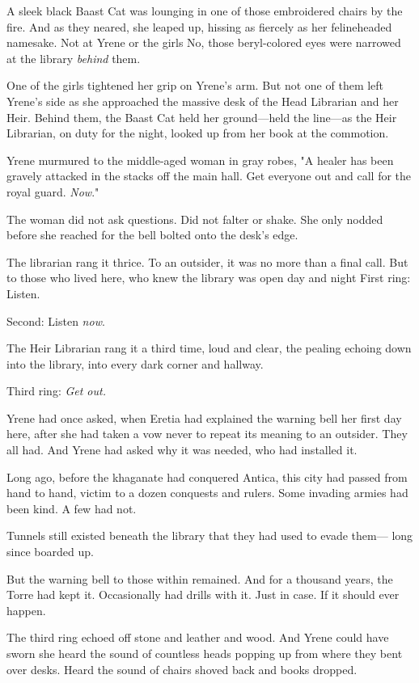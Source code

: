 A sleek black Baast Cat was lounging in one of those embroidered chairs by the fire. And as they neared, she leaped up, hissing as fiercely as her felineheaded namesake. Not at Yrene or the girls  No, those beryl-colored eyes were narrowed at the library \emph{behind} them.

One of the girls tightened her grip on Yrene's arm. But not one of them left Yrene's side as she approached the massive desk of the Head Librarian and her Heir. Behind them, the Baast Cat held her ground---held the line---as the Heir Librarian, on duty for the night, looked up from her book at the commotion.

Yrene murmured to the middle-aged woman in gray robes, "A healer has been gravely attacked in the stacks off the main hall. Get everyone out and call for the royal guard. \emph{Now}."

The woman did not ask questions. Did not falter or shake. She only nodded before she reached for the bell bolted onto the desk's edge.

The librarian rang it thrice. To an outsider, it was no more than a final call. But to those who lived here, who knew the library was open day and night  First ring: Listen.

Second: Listen \emph{now}.

The Heir Librarian rang it a third time, loud and clear, the pealing echoing down into the library, into every dark corner and hallway.

Third ring: \emph{Get out.}

Yrene had once asked, when Eretia had explained the warning bell her first day here, after she had taken a vow never to repeat its meaning to an outsider. They all had. And Yrene had asked why it was needed, who had installed it.

Long ago, before the khaganate had conquered Antica, this city had passed from hand to hand, victim to a dozen conquests and rulers. Some invading armies had been kind. A few had not.

Tunnels still existed beneath the library that they had used to evade them--- long since boarded up.

But the warning bell to those within remained. And for a thousand years, the Torre had kept it. Occasionally had drills with it. Just in case. If it should ever happen.

The third ring echoed off stone and leather and wood. And Yrene could have sworn she heard the sound of countless heads popping up from where they bent over desks. Heard the sound of chairs shoved back and books dropped.

